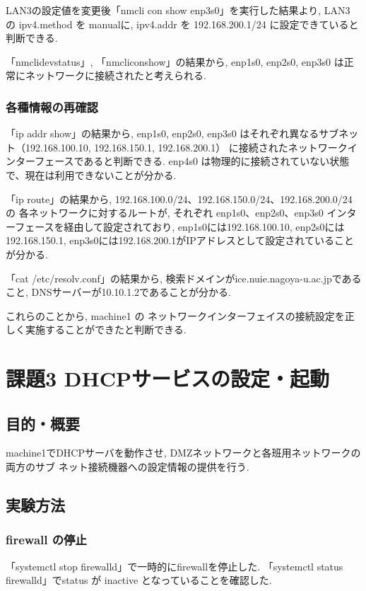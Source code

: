 \documentclass{ltjsarticle} %
\begin{document}
LAN3の設定値を変更後「nmcli con show enp3s0」を実行した結果より, LAN3 の ipv4.method を manualに, 
ipv4.addr を 192.168.200.1/24 に設定できていると判断できる.

「nmclidevstatus」, 「nmcliconshow」の結果から, enp1s0, enp2s0, enp3s0 は正常にネットワークに接続されたと考えられる. 

\subsubsection{各種情報の再確認}
「ip addr show」の結果から, enp1s0, enp2s0, enp3s0 はそれぞれ異なるサブネット（192.168.100.10, 192.168.150.1, 192.168.200.1）
に接続されたネットワークインターフェースであると判断できる. 
enp4s0 は物理的に接続されていない状態で、現在は利用できないことが分かる. 

「ip route」の結果から, 192.168.100.0/24、192.168.150.0/24、192.168.200.0/24 の
各ネットワークに対するルートが, それぞれ enp1s0、enp2s0、enp3s0 インターフェースを経由して設定されており, 
enp1s0には192.168.100.10, enp2s0には192.168.150.1, enp3s0には192.168.200.1がIPアドレスとして設定されていることが分かる. 

「cat /etc/resolv.conf」の結果から, 検索ドメインがice.nuie.nagoya-u.ac.jpであること, 
DNSサーバーが10.10.1.2であることが分かる. 

これらのことから, machine1 の ネットワークインターフェイスの接続設定を正しく実施することができたと判断できる.  

\section{課題3 DHCPサービスの設定・起動}

\subsection{目的・概要}
machine1でDHCPサーバを動作させ, DMZネットワークと各班用ネットワークの両方のサブ
ネット接続機器への設定情報の提供を行う.

\subsection{実験方法}

\subsubsection{firewall の停止}
「systemctl stop firewalld」で一時的にfirewallを停止した. 
「systemctl status firewalld」でstatus が inactive となっていることを確認した. 
\end{document}
